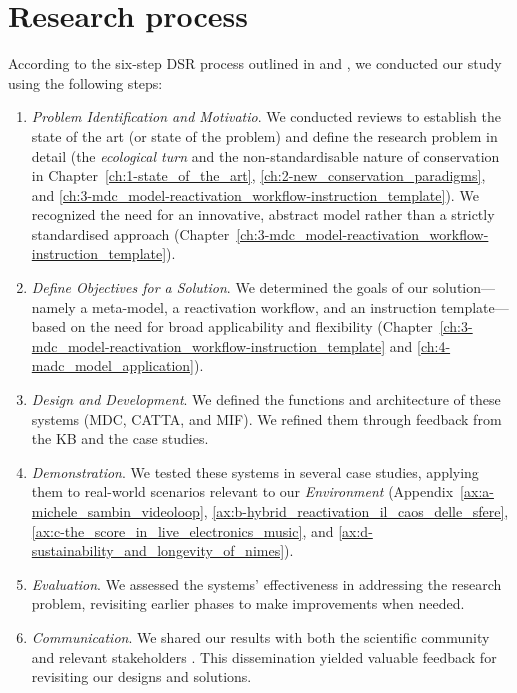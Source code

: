 \section{Research process}
According to the six-step DSR process outlined in \cite{peffers2007design} and \cite{brocke2020introduction}, we conducted our study using the following steps:
\begin{enumerate}
    \item \textit{Problem Identification and Motivatio}. We conducted reviews to establish the state of the art (or state of the problem) and define the research problem in detail (the \textit{ecological turn} and the non-standardisable nature of conservation in Chapter~\ref{ch:1-state_of_the_art}, \ref{ch:2-new_conservation_paradigms}, and \ref{ch:3-mdc_model-reactivation_workflow-instruction_template}). We recognized the need for an innovative, abstract model rather than a strictly standardised approach (Chapter~\ref{ch:3-mdc_model-reactivation_workflow-instruction_template}).
    \item \textit{Define Objectives for a Solution}. We determined the goals of our solution—namely a meta-model, a reactivation workflow, and an instruction template—based on the need for broad applicability and flexibility (Chapter~\ref{ch:3-mdc_model-reactivation_workflow-instruction_template} and \ref{ch:4-madc_model_application}).
    \item \textit{Design and Development}. We defined the functions and architecture of these systems (MDC, CATTA, and MIF). We refined them through feedback from the KB and the case studies.
    \item \textit{Demonstration}. We tested these systems in several case studies, applying them to real-world scenarios relevant to our \textit{Environment} (Appendix~\ref{ax:a-michele_sambin_videoloop}, \ref{ax:b-hybrid_reactivation_il_caos_delle_sfere}, \ref{ax:c-the_score_in_live_electronics_music}, and \ref{ax:d-sustainability_and_longevity_of_nimes}).
    \item \textit{Evaluation}. We assessed the systems’ effectiveness in addressing the research problem, revisiting earlier phases to make improvements when needed.
    \item \textit{Communication}. We shared our results with both the scientific community and relevant stakeholders \cite{fiordelmondo2023multilevel, fiordelmondo2023toward, fiordelmondo2024nime, fiordelmondo2024reactivating}. This dissemination yielded valuable feedback for revisiting our designs and solutions.
\end{enumerate}

